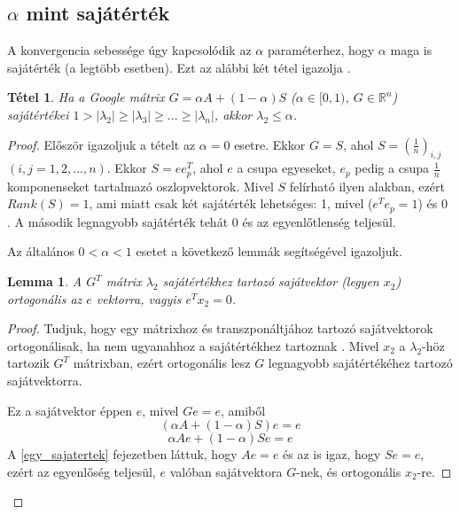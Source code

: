 \documentclass[12pt,a4paper]{article}
\newtheorem{tetel}{Tétel}
\newtheorem{lemma}{Lemma}
\begin{document}
\subsection{$\alpha$ mint sajátérték}\label{alfa_sajatertek}

A konvergencia sebessége úgy kapcsolódik az $\alpha$ paraméterhez, hogy $\alpha$ maga is sajátérték (a legtöbb esetben). Ezt az alábbi két tétel igazolja \cite{secondeigenvalue}. 

\vspace{0.1cm}
\begin{tetel}
		Ha a Google mátrix $G = \alpha A + (1-\alpha)S$ ($\alpha \in [0,1)$, $G \in \mathbb{R}^n$) sajátértékei $ 1 > |\lambda_2| \geq |\lambda_3| \geq ... \geq |\lambda_n|$, akkor $\lambda_2 \leq \alpha$.
\end{tetel}
\begin{proof}
	
	Először igazoljuk a tételt az $\alpha = 0$ esetre. Ekkor $G = S$, ahol $S = (\frac{1}{n})_{i,j}$ $(i,j = 1,2,...,n)$.
	Ekkor $S = e e_p^T$, ahol $e$ a csupa egyeseket, $e_p$ pedig a csupa $\frac{1}{n}$ komponenseket tartalmazó oszlopvektorok. Mivel $S$ felírható ilyen alakban, ezért $Rank(S) = 1$, ami miatt csak két sajátérték lehetséges: 1, mivel ($e^T e_p = 1$) és 0 \cite{rankonematrix}. A második legnagyobb sajátérték tehát 0 és az egyenlőtlenség teljesül.
	
	\vspace{0.1cm}
	Az általános $0 < \alpha < 1$ esetet a következő lemmák segítségével igazoljuk. 
	
	\begin{lemma}\label{orthogonal_lemma}
	 	A $G^T$ mátrix $\lambda_2$ sajátértékhez tartozó sajátvektor (legyen $x_2$) ortogonális az $e$ vektorra, vagyis $e^T x_2 = 0$.
	\end{lemma}
	\begin{proof}
		Tudjuk, hogy egy mátrixhoz és transzponáltjához tartozó sajátvektorok ortogonálisak, ha nem ugyanahhoz a sajátértékhez tartoznak \cite{orthogonal_eigenvectors}. Mivel $x_2$ a $\lambda_2$-höz tartozik $G^T$ mátrixban, ezért ortogonális lesz $G$ legnagyobb sajátértékéhez tartozó sajátvektorra. 
		
		Ez a sajátvektor éppen $e$, mivel $ G e = e$, amiből
		\[  ( \alpha A + (1-\alpha) S ) e = e  \]
		\[  \alpha A e + (1-\alpha) S e = e \]
		A \ref{egy_sajatertek} fejezetben láttuk, hogy $A e = e$ és az is igaz, hogy $S e = e$, ezért az egyenlőség teljesül, $e$ valóban sajátvektora $G$-nek, és ortogonális $x_2$-re.	
		\phantom\qedhere
	\end{proof}
	

\end{proof}
\end{document}
